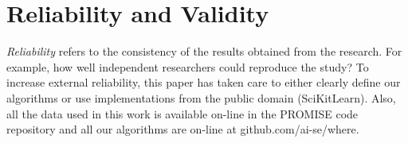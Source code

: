 \documentclass{sig-alternative}
\begin{document}
 
\section{Reliability and Validity}\label{sect:construct}


{\em Reliability} refers to the consistency of the results obtained
from the research.  For example,   how well independent researchers
could reproduce the study? To increase external
reliability, this paper has taken care to either  clearly define our
algorithms or use implementations from the public domain
(SciKitLearn). Also, all the data used in this work is available
on-line in the PROMISE code repository and all our algorithms
are on-line at github.com/ai-se/where.
\end{document}
